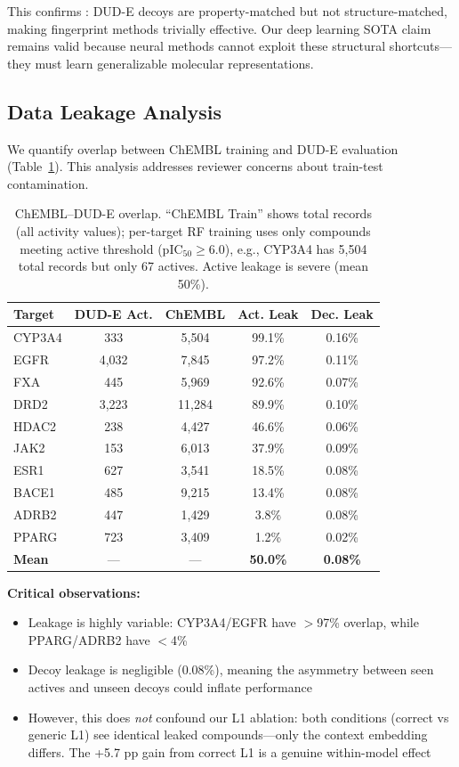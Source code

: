 \documentclass[sigconf,anonymous]{acmart}
\begin{document}
This confirms \citet{wallach_2018_dude_bias}: DUD-E decoys are property-matched but not structure-matched, making fingerprint methods trivially effective. Our deep learning SOTA claim remains valid because neural methods cannot exploit these structural shortcuts---they must learn generalizable molecular representations.

\subsection{Data Leakage Analysis}

We quantify overlap between ChEMBL training and DUD-E evaluation (Table~\ref{tab:leakage}). This analysis addresses reviewer concerns about train-test contamination.

\begin{table}[t]
\caption{ChEMBL--DUD-E overlap. ``ChEMBL Train'' shows total records (all activity values); per-target RF training uses only compounds meeting active threshold (pIC$_{50} \geq 6.0$), e.g., CYP3A4 has 5,504 total records but only 67 actives. Active leakage is severe (mean 50\%).}
\label{tab:leakage}
\centering
\small
\begin{tabular}{@{}lcccc@{}}
\toprule
Target & DUD-E Act. & ChEMBL & Act. Leak & Dec. Leak \\
\midrule
CYP3A4 & 333 & 5,504 & 99.1\% & 0.16\% \\
EGFR & 4,032 & 7,845 & 97.2\% & 0.11\% \\
FXA & 445 & 5,969 & 92.6\% & 0.07\% \\
DRD2 & 3,223 & 11,284 & 89.9\% & 0.10\% \\
HDAC2 & 238 & 4,427 & 46.6\% & 0.06\% \\
JAK2 & 153 & 6,013 & 37.9\% & 0.09\% \\
ESR1 & 627 & 3,541 & 18.5\% & 0.08\% \\
BACE1 & 485 & 9,215 & 13.4\% & 0.08\% \\
ADRB2 & 447 & 1,429 & 3.8\% & 0.08\% \\
PPARG & 723 & 3,409 & 1.2\% & 0.02\% \\
\midrule
\textbf{Mean} & --- & --- & \textbf{50.0\%} & \textbf{0.08\%} \\
\bottomrule
\end{tabular}
\end{table}

\textbf{Critical observations:}
\begin{itemize}[noitemsep,topsep=0pt]
\item Leakage is highly variable: CYP3A4/EGFR have $>$97\% overlap, while PPARG/ADRB2 have $<$4\%
\item Decoy leakage is negligible (0.08\%), meaning the asymmetry between seen actives and unseen decoys could inflate performance
\item However, this does \textit{not} confound our L1 ablation: both conditions (correct vs generic L1) see identical leaked compounds---only the context embedding differs. The +5.7 pp gain from correct L1 is a genuine within-model effect
\end{itemize}
\end{document}

